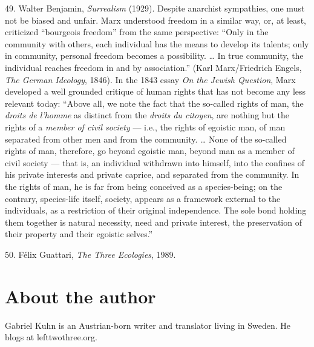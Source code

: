 {    49. Walter Benjamin, \textit{Surrealism} (1929). Despite anarchist
    sympathies, one must not be biased and unfair. Marx understood freedom in a
    similar way, or, at least, criticized “bourgeois freedom” from the same
    perspective: “Only in the community with others, each individual has the
    means to develop its talents; only in community, personal freedom becomes a
    possibility. … In true community, the individual reaches freedom in and by
    association.” (Karl Marx/Friedrich Engels, \textit{The German Ideology},
    1846). In the 1843 essay \textit{On the Jewish Question}, Marx developed a
    well grounded critique of human rights that has not become any less relevant
    today: “Above all, we note the fact that the so-called rights of man, the
    \textit{droits de l’homme} as distinct from the \textit{droits du citoyen},
    are nothing but the rights of a \textit{member of civil society} — i.e., the
    rights of egoistic man, of man separated from other men and from the
    community. … None of the so-called rights of man, therefore, go beyond
    egoistic man, beyond man as a member of civil society — that is, an
    individual withdrawn into himself, into the confines of his private
    interests and private caprice, and separated from the community. In the
    rights of man, he is far from being conceived as a species-being; on the
    contrary, species-life itself, society, appears as a framework external to
    the individuals, as a restriction of their original independence. The sole
    bond holding them together is natural necessity, need and private interest,
    the preservation of their property and their egoistic selves.”

    50. Félix Guattari, \textit{The Three Ecologies}, 1989.
}

\newpage
\thispagestyle{empty}
\mbox{}

\newpage
\thispagestyle{empty}

\vspace*{2.5cm}
\section*{About the author}
\vspace*{4cm}

Gabriel Kuhn is an Austrian-born writer and translator living in Sweden. He
blogs at lefttwothree.org.
